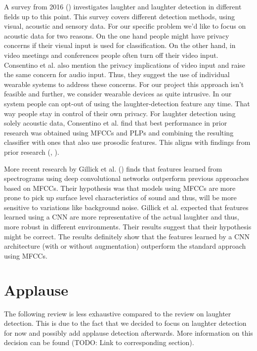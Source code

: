 \documentclass[bsc,frontabs,parskip,deptreport]{infthesis}
\begin{document}
A survey from 2016 (\cite{cosentino2016quantitative}) investigates laughter and laughter detection in different fields up to this point. This survey covers different detection methods, using visual, acoustic and sensory data. For our specific problem we'd like to focus on acoustic data for two reasons. On the one hand people might have privacy concerns if their visual input is used for classification. On the other hand, in video meetings and conferences people often turn off their video input. Consentino et al. also mention the privacy implications of video input and raise the same concern for audio input. Thus, they suggest the use of individual wearable systems to address these concerns. For our project this approach isn't feasible and further, we consider wearable devices as quite intrusive. In our system people can opt-out of using the laughter-detection feature any time. That way people stay in control of their own privacy.
For laughter detection using solely acoustic data, Consentino et al. find that best performance in prior research was obtained using MFCCs and PLPs and combining the resulting classifier with ones that also use prosodic features. This aligns with findings from prior research (\cite{truong2007automatic}, \cite{knox2006automatic}).

More recent research by Gillick et al. (\cite{gillick2021robust}) finds that features learned from spectrograms using deep convolutional networks outperform previous approaches based on MFCCs. Their hypothesis was that models using MFCCs are more prone to pick up surface level characteristics of sound and thus, will be more sensitive to variations like background noise. Gillick et al. expected that features learned using a CNN are more representative of the actual laughter and thus, more robust in different environments. 
Their results suggest that their hypothesis might be correct. The results definitely show that the features learned by a CNN architecture (with or without augmentation) outperform the standard approach using MFCCs. 


\section{Applause}
The following review is less exhaustive compared to the review on laughter detection. This is due to the fact that we decided to focus on laughter detection for now and possibly add applause detection afterwards. More information on this decision can be found (TODO: Link to corresponding section).
\end{document}
